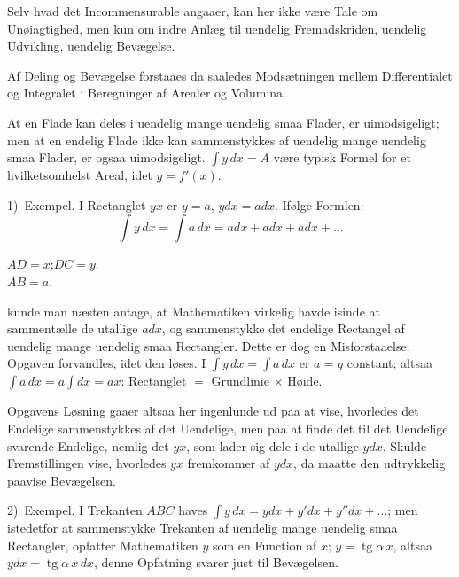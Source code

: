 \documentclass[12pt]{book}
\newcommand{\opage}[1]{\marginnote{\footnotesize\textit{[#1]}}}
\begin{document}
Selv hvad det Incommensurable angaaer, kan her ikke være Tale om
Unøiagtighed, men kun om indre Anlæg til uendelig Fremadskriden,
uendelig Udvikling, uendelig Bevægelse.

Af Deling og Bevægelse forstaaes da saaledes Modsætningen mellem
Differentialet og Integralet i Beregninger af Arealer og Volumina.

At en Flade kan deles i uendelig mange uendelig smaa Flader, er
uimodsigeligt; men at en endelig Flade ikke kan sammenstykkes af
uendelig mange uendelig smaa Flader, er ogsaa uimodsigeligt.
$\int y\,dx = A$ være typisk Formel for et hvilketsomhelst Areal, idet
$y = f'(x)$.

1)~Exempel. I Rectanglet $yx$ er $y = a$, $ydx = adx$. Ifølge
Formlen:
\[
\int y\,dx = \int a\,dx = adx + adx + adx + \dots
\]
\begin{center}

$AD = x$;\quad $DC = y$. \\
$AB = a$.
\end{center}

\opage{79} kunde man næsten antage, at Mathematiken virkelig havde isinde at
sammentælle de utallige $adx$, og sammenstykke det endelige Rectangel
af uendelig mange uendelig smaa Rectangler. Dette er dog en
Misforstaaelse. Opgaven forvandles, idet den løses. I
$\int y\,dx = \int a\,dx$ er $a = y$ constant; altsaa
$\int a\,dx = a\int dx = ax$: Rectanglet $=$ Grundlinie $\times$ Høide.

Opgavens Løsning gaaer altsaa her ingenlunde ud paa at vise, hvorledes
det Endelige sammenstykkes af det Uendelige, men paa at finde det til
det Uendelige svarende Endelige, nemlig det $yx$, som lader sig dele i
de utallige $ydx$. Skulde Fremstillingen vise, hvorledes $yx$
fremkommer af $ydx$, da maatte den udtrykkelig paavise Bevægelsen.

2)~Exempel. I Trekanten $ABC$ haves
$\int y\,dx = ydx + y'dx + y''dx + \dots$; men istedetfor at
sammenstykke Trekanten af uendelig mange uendelig smaa Rectangler,
opfatter Mathematiken $y$ som en Function af $x$;
$y = \operatorname{tg}\alpha\,x$, altsaa
$ydx = \operatorname{tg}\alpha\,x\,dx$, denne Opfatning svarer just til
Bevægelsen.
\end{document}
